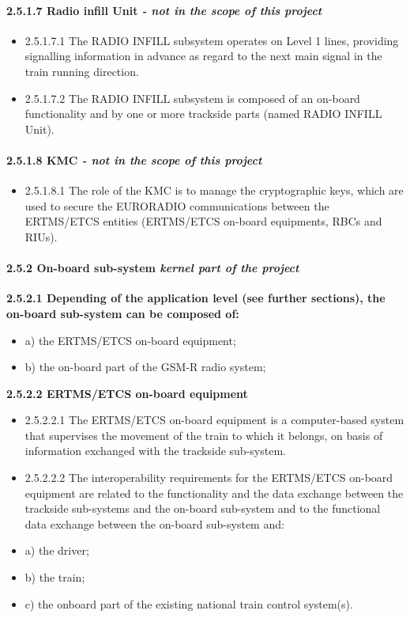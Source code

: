 \paragraph{2.5.1.7 Radio infill Unit \textit{- not in the scope of this project}}
\begin{itemize}
\item 2.5.1.7.1	The RADIO INFILL subsystem operates on Level 1 lines, providing signalling information in advance as regard to the next main signal in the train running direction.
\item 2.5.1.7.2	The RADIO INFILL subsystem is composed of an on-board functionality and by one or more trackside parts (named RADIO INFILL Unit).
\end{itemize}
 
\paragraph{2.5.1.8 KMC \textit{- not in the scope of this project}}
\begin{itemize}
\item 2.5.1.8.1	The role of the KMC is to manage the cryptographic keys, which are used to secure the EURORADIO communications between the ERTMS/ETCS entities (ERTMS/ETCS on-board equipments, RBCs and RIUs).
\end{itemize}

\paragraph{2.5.2 On-board sub-system \textit{kernel part of the project}}

\textbf{2.5.2.1	Depending of the application level (see further sections), the on-board sub-system can be composed of:}
\begin{itemize}
\item a)	the ERTMS/ETCS on-board equipment;
\item b)	the on-board part of the GSM-R  radio system;
\end{itemize}


\textbf{2.5.2.2	ERTMS/ETCS on-board equipment}
\begin{itemize}
\item 2.5.2.2.1	The ERTMS/ETCS on-board equipment is a computer-based system that supervises the movement of the train to which it belongs, on basis of information exchanged with the trackside sub-system. 
\item 2.5.2.2.2	The interoperability requirements for the ERTMS/ETCS on-board equipment are related to the functionality and the data exchange between the trackside sub-systems and the on-board sub-system and to the functional data exchange between the on-board sub-system and:
\item a) the driver;
\item b) the train;
\item c) the onboard part of the existing national train control system(s).
\end{itemize}

